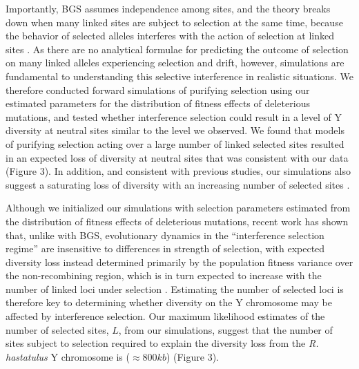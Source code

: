 \documentclass[9pt,twocolumn,twoside]{gsajnl}
\begin{document}
Importantly, BGS assumes independence among sites, and the theory breaks down when many linked sites are subject to selection at the same time, because the behavior of selected alleles interferes with the action of selection at linked sites \citep{good2014genetic,KaiserCharlesworth}. As there are no analytical formulae for predicting the outcome of selection on many linked alleles experiencing selection and drift, however, simulations are fundamental to understanding this selective interference in realistic situations. We therefore conducted forward simulations of purifying selection using our estimated parameters for the distribution of fitness effects of deleterious mutations, and tested whether interference selection could result in a level of Y diversity at neutral sites similar to the level we observed. We found that models of purifying selection acting over a large number of linked selected sites resulted in an expected loss of diversity at neutral sites that was consistent with our data (Figure 3). In addition, and consistent with previous studies, our simulations also suggest a saturating loss of diversity with an increasing number of selected sites \citep{KaiserCharlesworth}.

Although we initialized our simulations with selection parameters estimated from the distribution of fitness effects of deleterious mutations, recent work has shown that, unlike with BGS, evolutionary dynamics in the “interference selection regime” are insensitive to differences in strength of selection, with expected diversity loss instead determined primarily by the population fitness variance over the non-recombining region, which is in turn expected to increase with the number of linked loci under selection \citep{good2014genetic}. Estimating the number of selected loci is therefore key to determining whether diversity on the Y chromosome may be affected by interference selection. Our maximum likelihood estimates of the number of selected sites, $L$, from our simulations, suggest that the number of sites subject to selection required to explain the diversity loss from the \textit{R. hastatulus} Y chromosome is ($\approx 800 kb$) (Figure 3).
\end{document}
